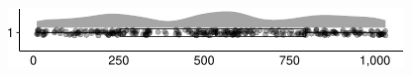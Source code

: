 \documentclass[
]{article}
\begin{document}
\begin{minipage}[t]{0.3\linewidth}

~

\end{minipage}%
\begin{minipage}[t]{0.7\linewidth}

\includegraphics[width=396px]{codebook_template_files/figure-latex/parent_index_rainplot-1}

\end{minipage}
 \vspace*{-5mm} 

\begin{minipage}[t]{0.3\linewidth}

~

\end{minipage}%
\begin{minipage}[t]{0.7\linewidth}

~

\end{minipage}
 \vspace*{-7mm} 
\end{document}

